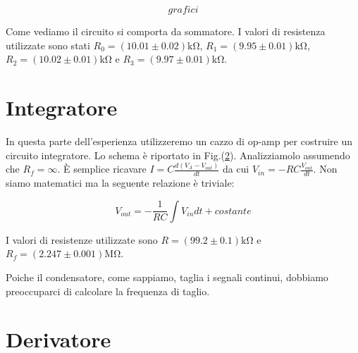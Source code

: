 $$grafici$$

Come vediamo il circuito si comporta da sommatore. I valori di resistenza utilizzate sono stati $R_0=(10.01\pm0.02)\si{\kilo\ohm}$, $R_1=(9.95\pm0.01)\si{\kilo\ohm}$, $R_2=(10.02\pm 0.01)\si{\kilo\ohm}$ e $R_3=(9.97\pm0.01)\si{\kilo\ohm}$.


\section{Integratore}

In questa parte dell'esperienza utilizzeremo un cazzo di op-amp per costruire un circuito integratore. Lo schema è riportato in Fig.(\ref{}). Analizziamolo assumendo che $R_f=\infty$. È semplice ricavare $I=C\frac{d(V_A-V_{out})}{dt}$ da cui $V_{in}=-RC\frac{V_{out}}{dt}$. Non siamo matematici ma la seguente relazione è triviale:

$$V_{out}=-\frac{1}{RC} \int V_{in}dt +costante$$

I valori di resistenze utilizzate sono $R=(99.2 \pm 0.1)\si{\kilo\ohm}$ e $R_f=(2.247 \pm 0.001)\si{\mega\ohm}$. 

Poiche il condensatore, come sappiamo, taglia i segnali continui, dobbiamo preoccuparci di calcolare la frequenza di taglio. 

\section{Derivatore}